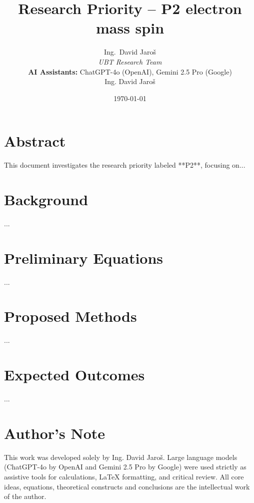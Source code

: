 \documentclass[12pt]{article}
\title{Research Priority – P2 electron mass spin}
\author{
Ing.~David Jaroš \\
\textit{UBT Research Team} \\
\textbf{AI Assistants:} ChatGPT-4o (OpenAI), Gemini 2.5 Pro (Google) \\
Ing. David Jaroš}
\date{\today}
\begin{document}
\maketitle

\section*{Abstract}
This document investigates the research priority labeled **P2**, focusing on...

\section*{Background}
...

\section*{Preliminary Equations}
...

\section*{Proposed Methods}
...

\section*{Expected Outcomes}
...


\section*{Author's Note}

This work was developed solely by Ing. David Jaroš.  
Large language models (ChatGPT-4o by OpenAI and Gemini 2.5 Pro by Google) were used strictly as assistive tools for calculations, LaTeX formatting, and critical review.  
All core ideas, equations, theoretical constructs and conclusions are the intellectual work of the author.
\end{document}
